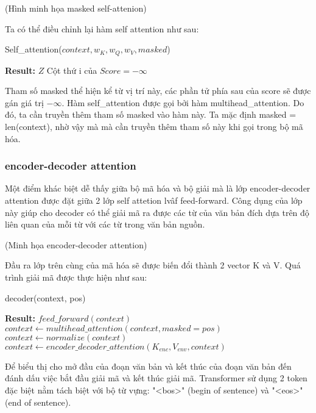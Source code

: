 (Hình minh họa masked self-attenion)

Ta có thể điều chỉnh lại hàm self attention như sau:

\begin{algorithm}[H]
    \caption{Self\_attention($context, w_K, w_Q, w_V, masked$)}
    \begin{algorithmic}[1]
		\State \textbf{Result:} $Z$
			\State Cột thứ i của $Score = -\infty$
		\EndFor
    \end{algorithmic}
\end{algorithm}

Tham số masked thể hiện kể từ vị trí này, các phần tử phía sau của score sẽ được gán giá trị $-\infty$. Hàm self\_attention được gọi bởi hàm multihead\_attention. Do đó, ta cần truyền thêm tham số masked vào hàm này. Ta mặc định masked = len(context), nhờ vậy mà mà cần truyền thêm tham số này khi gọi trong bộ mã hóa.


\subsubsection{encoder-decoder attention}
Một điểm khác biệt dễ thấy giữa bộ mã hóa và bộ giải mà là lớp encoder-decoder attention được đặt giữa 2 lớp self attetion lvâf feed-forward. Công dụng của lớp này giúp cho decoder có thể giải mã ra được các từ của văn bản đích dựa trên độ liên quan của mỗi từ với các từ trong văn bản nguồn. 

(Minh họa encoder-decoder attention)

Đầu ra lớp trên cùng của mã hóa sẽ được biến đổi thành 2 vector K và V. Quá trình giải mã được thực hiện như sau:


\begin{algorithm}[H]
    \caption{decoder(context, pos)}
    \begin{algorithmic}[1]
		\State \textbf{Result:} $feed\_forward(context)$
		\State $context \gets multihead\_attention(context, masked = pos)$
		\State $context \gets normalize(context)$
		\State $context \gets encoder\_decoder\_attention(K_{enc}, V_{env}, context)$
    \end{algorithmic}
\end{algorithm}

Để biểu thị cho mở đầu của đoạn văn bản và kết thúc của đoạn văn bản đến đánh dấu việc bắt đầu giải mã và kết thúc giải mã. Transformer sử dụng 2 token đặc biệt nằm tách biệt với bộ từ vựng: "<bos>" (begin of sentence) và "<eos>" (end of sentence).

